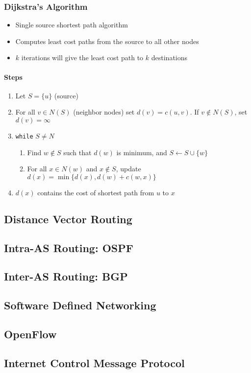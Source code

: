 \subsubsection{Dijkstra's Algorithm}
\begin{itemize}
	\item Single source shortest path algorithm
	\item Computes least cost paths from the source to all other nodes
	\item \(k\) iterations will give the least cost path to \(k\) destinations
\end{itemize}

\paragraph{Steps}
\begin{enumerate}
	\item Let \(S = \{u\}\) (source)
	\item For all \(v \in N(S)\) (neighbor nodes) set \(d(v) = c(u, v)\). If \(v\notin N(S)\), set \(d(v) = \infty\)
	\item \texttt{while} \(S \neq N\)
	\begin{enumerate}
		\item Find \(w\notin S\) such that \(d(w)\) is minimum, and \(S \leftarrow S\cup \{w\}\)
		\item For all \(x\in N(w)\) and \(x\notin S\), update \(d(x) = \min\{d(x), d(w) + c(w, x)\}\)
	\end{enumerate}
	\item \(d(x)\) contains the cost of shortest path from \(u\) to \(x\)
\end{enumerate}

\subsection{Distance Vector Routing}

\subsection{Intra-AS Routing: OSPF}

\subsection{Inter-AS Routing: BGP}

\subsection{Software Defined Networking}

\subsection{OpenFlow}

\subsection{Internet Control Message Protocol}

\newpage